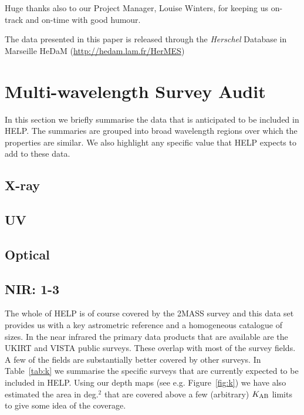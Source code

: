 \documentclass[usenatbib]{mnras}
\begin{document}
Huge thanks also to our Project Manager, Louise Winters, for keeping us on-track
and on-time with good humour.

The data presented in this paper is released through the {\em Herschel} Database
in Marseille HeDaM ({\url{http://hedam.lam.fr/HerMES}})





\appendix




\section{Multi-wavelength Survey Audit}

In this section we briefly summarise the data that is anticipated to be included
in HELP.   The summaries are grouped into broad wavelength regions over which
the properties are similar. We also highlight any specific value that HELP
expects to add to these data.

\subsection{X-ray}

\subsection{UV}

\subsection{Optical}

\subsection{NIR: 1-3\micron}

The whole of HELP is of course covered by the 2MASS survey and this data set
provides us with a key astrometric reference and a homogeneous catalogue of
sizes.  In the  near infrared the primary data products that are available are
the UKIRT and VISTA public surveys.  These overlap with most of the survey
fields. A few of the fields are substantially better covered by other surveys.
In Table~\ref{tab:k} we summarise the specific surveys that are currently
expected to be included in HELP.  Using our depth maps (see e.g.
Figure~\ref{fig:k}) we have also estimated the area in deg.$^2$ that are covered
above a few (arbitrary) $K_{\rm AB}$ limits to give some idea of the coverage.
\end{document}
